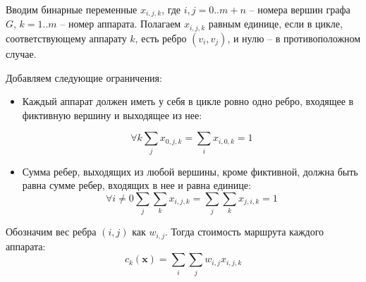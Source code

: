 \documentclass[a4paper,14pt,russian]{article}
\begin{document}
Вводим бинарные переменные $x_{i,j,k}$, где $i, j = 0..m+n$ -- номера вершин графа $G$, $k = 1..m$ -- номер аппарата. Полагаем $x_{i,j,k}$ равным единице, если в цикле, соответствующему аппарату $k$, есть ребро $(v_i, v_j)$, и нулю -- в противоположном случае.

Добавляем следующие ограничения:
\begin{itemize}

\item Каждый аппарат должен иметь у себя в цикле ровно одно ребро, входящее в фиктивную вершину и выходящее из нее:


\begin{equation} \label{lin1}
\forall k \displaystyle\sum_j x_{0,j,k} = \displaystyle\sum_i x_{i,0,k} = 1
\end{equation}

\item Сумма ребер, выходящих из любой вершины, кроме фиктивной, должна быть равна сумме ребер, входящих в нее и равна единице:
\begin{equation}
\forall i \neq 0 \displaystyle\sum_j \displaystyle\sum_k x_{i,j,k} = \displaystyle\sum_j \displaystyle\sum_k x_{j,i,k} = 1
\end{equation}

\end{itemize}

Обозначим вес ребра $(i, j)$ как $w_{i,j}$. Тогда стоимость маршрута каждого аппарата:
\begin{equation}
c_k(\mathbf{x}) = \displaystyle\sum_i \displaystyle\sum_j w_{i,j} x_{i,j,k}
\end{equation}


\end{document}
